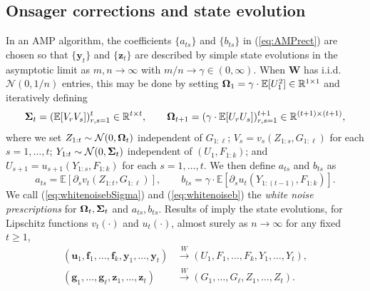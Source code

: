 \documentclass[10pt,reqno]{amsart}
\def\u{\mathbf{u}}
\def\y{\mathbf{y}}
\def\z{\mathbf{z}}
\def\f{\mathbf{f}}
\def\g{\mathbf{g}}
\def\W{\mathbf{W}}
\def\E{\mathbb{E}}
\def\R{\mathbb{R}}
\def\Normal{\mathcal{N}}
\def\toW{\overset{W}{\to}}
\begin{document}
\subsection{Onsager corrections and state evolution}\label{subsec:rectsetup}

In an AMP algorithm,
the coefficients $\{a_{ts}\}$ and $\{b_{ts}\}$ in (\ref{eq:AMPrect}) are chosen
so that $\{\y_t\}$ and $\{\z_t\}$ are described by simple state evolutions in 
the asymptotic limit as $m, n \to \infty$ with $m/n \to \gamma \in (0,\infty)$.
When $\W$ has i.i.d.\ $\Normal(0,1/n)$ entries, this may be done by setting
$\bOmega_1=\gamma \cdot \E[U_1^2] \in \R^{1 \times 1}$ and iteratively defining
\begin{equation}\label{eq:whitenoisebSigma}
\bSigma_t=(\E[V_rV_s])_{r,s=1}^t \in \R^{t \times t}, \qquad
\bOmega_{t+1}=(\gamma \cdot \E[U_rU_s])_{r,s=1}^{t+1} \in \R^{(t+1) \times (t+1)},
\end{equation}
where we set $Z_{1:t} \sim \Normal(0,\bOmega_t)$ independent of $G_{1:\ell}$;
$V_s=v_s(Z_{1:s},G_{1:\ell})$ for each $s=1,\ldots,t$;
$Y_{1:t} \sim \Normal(0,\bSigma_t)$ independent of $(U_1,F_{1:k})$; and
$U_{s+1}=u_{s+1}(Y_{1:s},F_{1:k})$ for each $s=1,\ldots,t$. We then define
$a_{ts}$ and $b_{ts}$ as
\begin{equation}\label{eq:whitenoiseb}
a_{ts}=\E[\partial_s v_t(Z_{1:t},G_{1:\ell})],
\qquad b_{ts}=\gamma \cdot \E[\partial_s u_t(Y_{1:(t-1)},F_{1:k})].
\end{equation}
We call (\ref{eq:whitenoisebSigma}) and (\ref{eq:whitenoiseb}) the
\emph{white noise prescriptions} for $\bm{\Omega}_t,\bm{\Sigma}_t$ and $a_{ts},b_{ts}$.
Results of \cite{bayati2011dynamics,javanmard2013state} imply the state
evolutions, for Lipschitz functions $v_t(\cdot)$ and $u_t(\cdot)$,
almost surely as $n \to \infty$ for any fixed $t \geq 1$,
\begin{align*}
(\u_1,\f_1,\ldots,\f_k,\y_1,\ldots,\y_t) &\toW
(U_1,F_1,\ldots,F_k,Y_1,\ldots,Y_t),\\
(\g_1,\ldots,\g_\ell,\z_1,\ldots,\z_t) &\toW
(G_1,\ldots,G_\ell,Z_1,\ldots,Z_t).
\end{align*}
\end{document}
